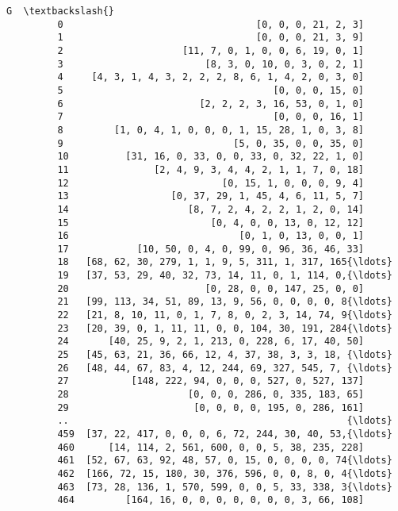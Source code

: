 \documentclass[11pt]{article}
\begin{document}
\begin{Verbatim}[commandchars=\\\{\}]
                                                              G  \textbackslash{}
         0                                  [0, 0, 0, 21, 2, 3]   
         1                                  [0, 0, 0, 21, 3, 9]   
         2                     [11, 7, 0, 1, 0, 0, 6, 19, 0, 1]   
         3                         [8, 3, 0, 10, 0, 3, 0, 2, 1]   
         4     [4, 3, 1, 4, 3, 2, 2, 2, 8, 6, 1, 4, 2, 0, 3, 0]   
         5                                     [0, 0, 0, 15, 0]   
         6                        [2, 2, 2, 3, 16, 53, 0, 1, 0]   
         7                                     [0, 0, 0, 16, 1]   
         8         [1, 0, 4, 1, 0, 0, 0, 1, 15, 28, 1, 0, 3, 8]   
         9                              [5, 0, 35, 0, 0, 35, 0]   
         10          [31, 16, 0, 33, 0, 0, 33, 0, 32, 22, 1, 0]   
         11               [2, 4, 9, 3, 4, 4, 2, 1, 1, 7, 0, 18]   
         12                           [0, 15, 1, 0, 0, 0, 9, 4]   
         13                  [0, 37, 29, 1, 45, 4, 6, 11, 5, 7]   
         14                     [8, 7, 2, 4, 2, 2, 1, 2, 0, 14]   
         15                         [0, 4, 0, 0, 13, 0, 12, 12]   
         16                              [0, 1, 0, 13, 0, 0, 1]   
         17            [10, 50, 0, 4, 0, 99, 0, 96, 36, 46, 33]   
         18   [68, 62, 30, 279, 1, 1, 9, 5, 311, 1, 317, 165{\ldots}   
         19   [37, 53, 29, 40, 32, 73, 14, 11, 0, 1, 114, 0,{\ldots}   
         20                        [0, 28, 0, 0, 147, 25, 0, 0]   
         21   [99, 113, 34, 51, 89, 13, 9, 56, 0, 0, 0, 0, 8{\ldots}   
         22   [21, 8, 10, 11, 0, 1, 7, 8, 0, 2, 3, 14, 74, 9{\ldots}   
         23   [20, 39, 0, 1, 11, 11, 0, 0, 104, 30, 191, 284{\ldots}   
         24       [40, 25, 9, 2, 1, 213, 0, 228, 6, 17, 40, 50]   
         25   [45, 63, 21, 36, 66, 12, 4, 37, 38, 3, 3, 18, {\ldots}   
         26   [48, 44, 67, 83, 4, 12, 244, 69, 327, 545, 7, {\ldots}   
         27           [148, 222, 94, 0, 0, 0, 527, 0, 527, 137]   
         28                     [0, 0, 0, 286, 0, 335, 183, 65]   
         29                      [0, 0, 0, 0, 195, 0, 286, 161]   
         ..                                                 {\ldots}   
         459  [37, 22, 417, 0, 0, 0, 6, 72, 244, 30, 40, 53,{\ldots}   
         460      [14, 114, 2, 561, 600, 0, 0, 5, 38, 235, 228]   
         461  [52, 67, 63, 92, 48, 57, 0, 15, 0, 0, 0, 0, 74{\ldots}   
         462  [166, 72, 15, 180, 30, 376, 596, 0, 0, 8, 0, 4{\ldots}   
         463  [73, 28, 136, 1, 570, 599, 0, 0, 5, 33, 338, 3{\ldots}   
         464         [164, 16, 0, 0, 0, 0, 0, 0, 0, 3, 66, 108]   

\end{Verbatim}
\end{document}
